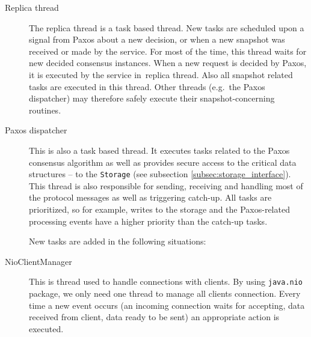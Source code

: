 \begin{description}
  \item[Replica thread] \hfill

    The replica thread is a task based thread. New tasks are scheduled upon a signal from Paxos about a new decision, or when a new snapshot was received or made by the service. For most of the time, this thread waits for new decided consensus instances. When a new request is decided by Paxos, it is executed by the service in~replica thread. Also all snapshot related tasks are executed in this thread. Other threads (e.g.\ the Paxos dispatcher) may therefore safely execute their snapshot-concerning routines.
    
  \item[Paxos dispatcher] \hfill \nopagebreak
    
    This is also a task based thread. It executes tasks related to the Paxos consensus algorithm as well as provides secure access to the critical data structures -- to the \texttt{Storage} (see subsection \ref{subsec:storage_interface}). This thread is also responsible for sending, receiving and handling most of the protocol messages as well as triggering catch-up. \linebreak All tasks are prioritized, so for example, writes to the storage and the Paxos-related processing events have a higher priority than the catch-up tasks.
    
    New tasks are added in the following situations:
    
  \item[NioClientManager] \hfill

    This is thread used to handle connections with clients. By using \texttt{java.nio} package, we only need one thread to manage all clients connection. Every time a new event occurs (an incoming connection waits for accepting, data received from client, data ready to be sent) an appropriate action is executed. 


\end{description}
